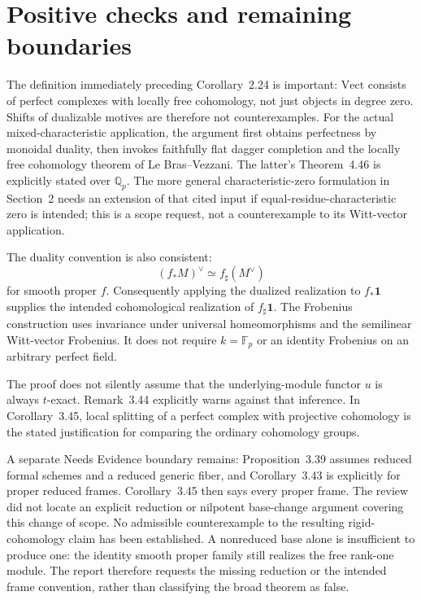 \documentclass[10pt]{article}
\begin{document}
\section*{Positive checks and remaining boundaries}
The definition immediately preceding Corollary 2.24 is important: \(\mathrm{Vect}\) consists of perfect complexes with locally free cohomology, not just objects in degree zero. Shifts of dualizable motives are therefore not counterexamples. For the actual mixed-characteristic application, the argument first obtains perfectness by monoidal duality, then invokes faithfully flat dagger completion and the locally free cohomology theorem of Le Bras–Vezzani. The latter’s Theorem 4.46 is explicitly stated over \(\mathbb Q_p\). The more general characteristic-zero formulation in Section 2 needs an extension of that cited input if equal-residue-characteristic zero is intended; this is a scope request, not a counterexample to its Witt-vector application.\par
The duality convention is also consistent: \[(f_*M)^\vee\simeq f_\sharp(M^\vee)\] for smooth proper \(f\). Consequently applying the dualized realization to \(f_*\mathbf1\) supplies the intended cohomological realization of \(f_\sharp\mathbf1\). The Frobenius construction uses invariance under universal homeomorphisms and the semilinear Witt-vector Frobenius. It does not require \(k=\mathbb F_p\) or an identity Frobenius on an arbitrary perfect field.\par
The proof does not silently assume that the underlying-module functor \(u\) is always \(t\)-exact. Remark 3.44 explicitly warns against that inference. In Corollary 3.45, local splitting of a perfect complex with projective cohomology is the stated justification for comparing the ordinary cohomology groups.\par
A separate Needs Evidence boundary remains: Proposition 3.39 assumes reduced formal schemes and a reduced generic fiber, and Corollary 3.43 is explicitly for proper reduced frames. Corollary 3.45 then says every proper frame. The review did not locate an explicit reduction or nilpotent base-change argument covering this change of scope. No admissible counterexample to the resulting rigid-cohomology claim has been established. A nonreduced base alone is insufficient to produce one: the identity smooth proper family still realizes the free rank-one module. The report therefore requests the missing reduction or the intended frame convention, rather than classifying the broad theorem as false.\par
\end{document}
